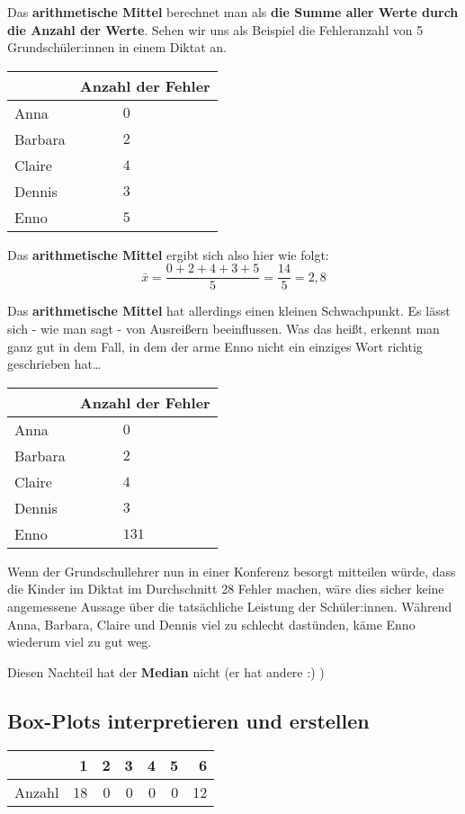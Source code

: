 \documentclass[
  ngerman,
]{book}
\begin{document}
Das \textbf{arithmetische Mittel} berechnet man als \textbf{die Summe aller Werte durch die Anzahl der Werte}. Sehen wir uns als Beispiel die Fehleranzahl von 5 Grundschüler:innen in einem Diktat an.

\begin{longtable}[]{@{}ll@{}}
\toprule
& Anzahl der Fehler\tabularnewline
\midrule
\endhead
Anna & \(\quad\quad\quad 0\)\tabularnewline
Barbara & \(\quad\quad\quad 2\)\tabularnewline
Claire & \(\quad\quad\quad 4\)\tabularnewline
Dennis & \(\quad\quad\quad 3\)\tabularnewline
Enno & \(\quad\quad\quad 5\)\tabularnewline
\bottomrule
\end{longtable}

Das \textbf{arithmetische Mittel} ergibt sich also hier wie folgt:
\[\bar{x} = \frac{0+2+4+3+5}{5} = \frac{14}{5} =2,8\]

Das \textbf{arithmetische Mittel} hat allerdings einen kleinen Schwachpunkt. Es lässt sich - wie man sagt - von Ausreißern beeinflussen. Was das heißt, erkennt man ganz gut in dem Fall, in dem der arme Enno nicht ein einziges Wort richtig geschrieben hat\ldots{}

\begin{longtable}[]{@{}ll@{}}
\toprule
& Anzahl der Fehler\tabularnewline
\midrule
\endhead
Anna & \(\quad\quad\quad 0\)\tabularnewline
Barbara & \(\quad\quad\quad 2\)\tabularnewline
Claire & \(\quad\quad\quad 4\)\tabularnewline
Dennis & \(\quad\quad\quad 3\)\tabularnewline
Enno & \(\quad\quad\quad 131\)\tabularnewline
\bottomrule
\end{longtable}

Wenn der Grundschullehrer nun in einer Konferenz besorgt mitteilen würde, dass die Kinder im Diktat im Durchschnitt 28 Fehler machen, wäre dies sicher keine angemessene Aussage über die tatsächliche Leistung der Schüler:innen. Während Anna, Barbara, Claire und Dennis viel zu schlecht dastünden, käme Enno wiederum viel zu gut weg.

Diesen Nachteil hat der \textbf{Median} nicht (er hat andere :) )

\hypertarget{box-plots-interpretieren-und-erstellen}{%
\subsection*{Box-Plots interpretieren und erstellen}\label{box-plots-interpretieren-und-erstellen}}

\begin{tabular}[t]{l|r|r|r|r|r|r}
\hline
  & 1 & 2 & 3 & 4 & 5 & 6\\
\hline
Anzahl & 18 & 0 & 0 & 0 & 0 & 12\\
\hline
\end{tabular}
\end{document}
